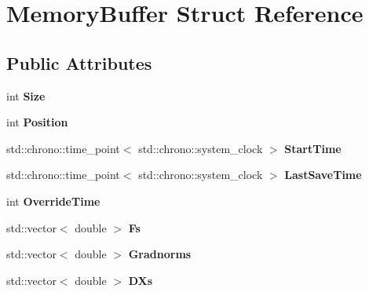 \hypertarget{structMemoryBuffer}{}\section{Memory\+Buffer Struct Reference}
\label{structMemoryBuffer}
\subsection*{Public Attributes}
\begin{DoxyCompactItemize}
\item 
\mbox{\label{structMemoryBuffer_a9dd45cbef6dc3a2b739930e4dec409d3}} 
int {\bfseries Size}
\item 
\mbox{\label{structMemoryBuffer_a86585015fa99011516592b628f70db83}} 
int {\bfseries Position}
\item 
\mbox{\label{structMemoryBuffer_a4e662ae94caa8b785bd7275b895cc8fb}} 
std\+::chrono\+::time\+\_\+point$<$ std\+::chrono\+::system\+\_\+clock $>$ {\bfseries Start\+Time}
\item 
\mbox{\label{structMemoryBuffer_ad72781d6a1db3dfbf6c81596c8a07f00}} 
std\+::chrono\+::time\+\_\+point$<$ std\+::chrono\+::system\+\_\+clock $>$ {\bfseries Last\+Save\+Time}
\item 
\mbox{\label{structMemoryBuffer_a3398f730a3eb1ae6c93b3e7df134522a}} 
int {\bfseries Override\+Time}
\item 
\mbox{\label{structMemoryBuffer_ab047fd7f062b4db7bd4cdfff7bdaf62c}} 
std\+::vector$<$ double $>$ {\bfseries Fs}
\item 
\mbox{\label{structMemoryBuffer_a130230435c568e4d3af8fc2bd3223293}} 
std\+::vector$<$ double $>$ {\bfseries Gradnorms}
\item 
\mbox{\label{structMemoryBuffer_a99afdaad76269c41ed13560ff1fdafb7}} 
std\+::vector$<$ double $>$ {\bfseries D\+Xs}
\item 
\mbox{\label{structMemoryBuffer_a966ec2eb4f30c5b27bddccb16b6e1c1b}} 

\end{DoxyCompactItemize}
